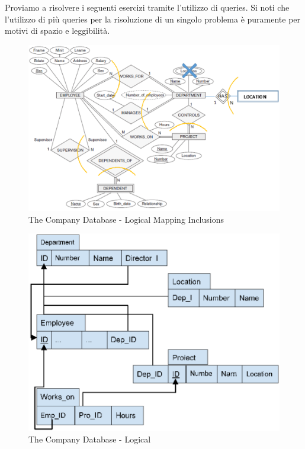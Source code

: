 Proviamo a risolvere i seguenti esercizi tramite l’utilizzo di queries. Si noti che l’utilizzo di più queries per la risoluzione di un singolo problema è puramente per motivi di spazio e leggibilità. 

\begin{center}
\begin{figure}[H]
\centering
\includegraphics[scale=0.8]{figures/tcdmod.png}
\caption{The Company Database - Logical Mapping Inclusions} 
\end{figure}
\end{center}

\begin{center}
\begin{figure}[H]
\centering
\includegraphics[scale=1]{figures/tcd_logical.png}
\caption{The Company Database - Logical} 
\end{figure}
\end{center}


